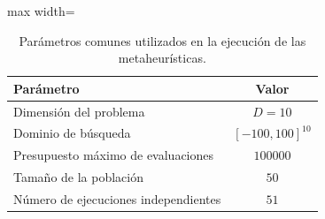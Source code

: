 \begin{table}[H]
    \centering
    \begin{adjustbox}{max width=\textwidth}
        \begin{tabular}{lc}
        \toprule
        \textbf{Parámetro}                   & \textbf{Valor}            \\
        \midrule
        Dimensión del problema               & \(D=10\)                  \\
        Dominio de búsqueda                  & \([-100,100]^{10}\)       \\
        Presupuesto máximo de evaluaciones   & \(100000\)                \\
        Tamaño de la población               & \(50\)                    \\
        Número de ejecuciones independientes & \(51\)                    \\
        \bottomrule
        \end{tabular}
    \end{adjustbox}
    \caption{Parámetros comunes utilizados en la ejecución de las
        metaheurísticas.}
    \label{tab:parametros_comunes_metaheuristicas}
\end{table}
